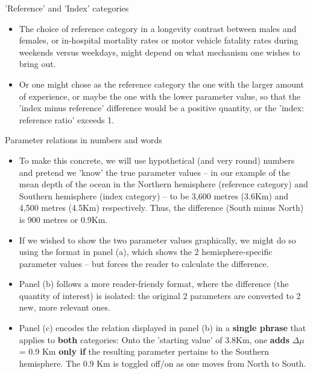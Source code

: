 \documentclass[10pt]{beamer}\usepackage[]{graphicx}\usepackage[]{color}
\begin{document}
\begin{frame}{'Reference' and 'Index' categories}
	\begin{itemize}
		\item The choice of reference category in a longevity contrast between males and females, or in-hospital mortality rates or motor vehicle fatality rates during weekends versus weekdays, might depend on what mechanism one wishes to bring out. 
		
		\item Or one might chose as the reference category the one with the larger amount of experience, or maybe the one with the lower parameter value, so that the 'index minus reference' difference would be a positive quantity, or the 'index: reference ratio' exceeds 1.
	\end{itemize}
\end{frame}



\begin{frame}{Parameter relations in numbers and words}
\begin{itemize}
\item To make this concrete, we will use hypothetical (and very round) numbers and pretend we 'know' the true parameter values -- in our example
of the mean depth of the ocean in the Northern hemisphere (reference category) and Southern hemisphere (index category) -- to be 3,600 metres (3.6Km) and 4,500 metres (4.5Km) respectively. Thus, the difference (South minus North) is 900 metres or 0.9Km.
\pause
\item If we wished to show the two parameter values graphically, we might do so using the format in panel (a), which shows the 2 hemisphere-specific parameter values -- but forces the reader to calculate the difference.

\item Panel (b) follows a more reader-friendy format, where the difference (the quantity of interest) is isolated:  the original 2 parameters are converted to 2 new, more relevant ones. 

\item Panel (c) encodes the relation displayed in panel (b) in a \textbf{single phrase} that applies to \textbf{both} categories: Onto the 'starting value' of 3.8Km, one \textbf{adds} $\Delta \mu$ = 0.9 Km \textbf{only if} the  resulting parameter pertains to the Southern hemisphere. The 0.9 Km is toggled off/on as one moves from North to South.   
\end{itemize}
\end{frame}
\end{document}
